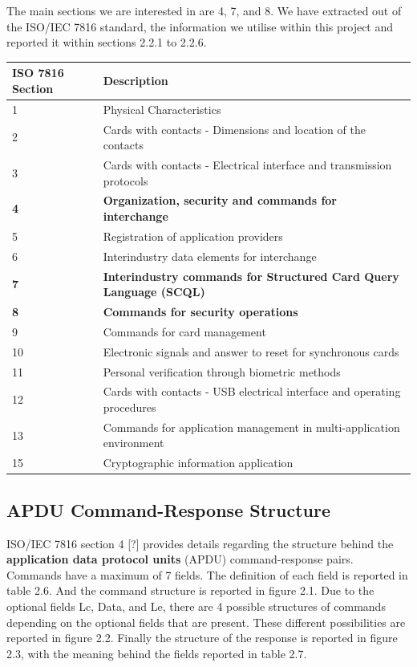 \documentclass[bsc,frontabs,twoside,singlespacing,parskip,deptreport]{infthesis}     %
\begin{document}
The main sections we are interested in are 4, 7, and 8. We have extracted out of the ISO/IEC 7816 standard, the information we utilise within this project and reported it within sections 2.2.1 to 2.2.6.

\begin{table}[H]
\begin{tabular}{|l|p{12cm}|}
\hline
ISO 7816 Section & Description\\
\hline
1 & Physical Characteristics \\
\hline
2 & Cards with contacts - Dimensions and location of the contacts \\
\hline
3 & Cards with contacts - Electrical interface and transmission protocols \\
\hline
\textbf{4}  & \textbf{Organization, security and commands for interchange} \\
\hline
5 & Registration of application providers \\
\hline
6 & Interindustry data elements for interchange \\
\hline
\textbf{7} & \textbf{Interindustry commands for Structured Card Query Language (SCQL)} \\
\hline
\textbf{8} & \textbf{Commands for security operations} \\
\hline
9 & Commands for card management \\
\hline
10 & Electronic signals and answer to reset for synchronous cards \\
\hline
11 & Personal verification through biometric methods \\
\hline
12 & Cards with contacts - USB electrical interface and operating procedures \\
\hline
13 & Commands for application management in multi-application environment \\
\hline
15 & Cryptographic information application \\
\hline
\end{tabular}
\end{table}


\subsection{APDU Command-Response Structure}

ISO/IEC 7816 section 4 [?] provides details regarding the structure behind the \textbf{application data protocol units} (APDU) command-response pairs. Commands have a maximum of 7 fields. The definition of each field is reported in table 2.6.  And the command structure is reported in figure 2.1. Due to the optional fields Lc, Data, and Le, there are 4 possible structures of commands depending on the optional fields that are present. These different possibilities are reported in figure 2.2. Finally the structure of the response is reported in figure 2.3, with the meaning behind the fields reported in table 2.7.
\end{document}
